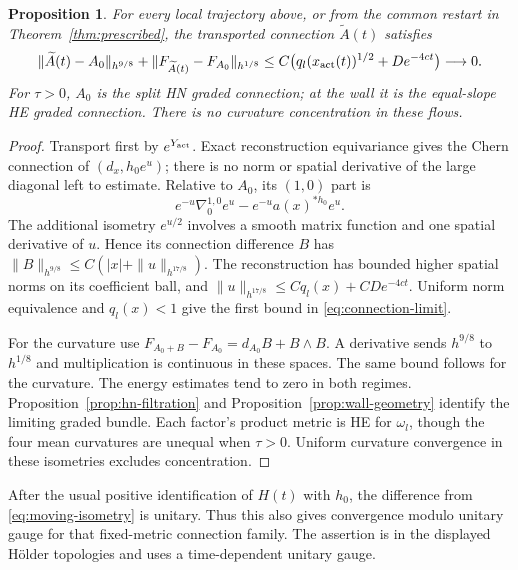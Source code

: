 \documentclass[11pt]{amsart}
\newtheorem{proposition}[theorem]{Proposition}
\theoremstyle{definition}
\theoremstyle{remark}
\begin{document}
\begin{proposition}\label{prop:graded-limit}
For every local trajectory above, or from the common restart
in Theorem~\ref{thm:prescribed}, the transported connection
$\widetilde A(t)$ satisfies
\begin{equation}\label{eq:connection-limit}
 \|\widetilde A(t)-A_0\|_{h^{9/8}}
 +\|F_{\widetilde A(t)}-F_{A_0}\|_{h^{1/8}}
       \le C\bigl(q_l(x_{\rm act}(t))^{1/2}+D e^{-4ct}\bigr)
       \longrightarrow0 .
\end{equation}
For $\tau>0$, $A_0$ is the split HN graded connection;
at the wall it is the equal-slope HE graded connection.
There is no curvature concentration in these flows.
\end{proposition}
\begin{proof}
Transport first by $e^{Y_{\rm act}}$. Exact reconstruction
equivariance gives the Chern connection of $(d_x,h_0e^u)$;
there is no norm or spatial derivative of the large diagonal
left to estimate. Relative to $A_0$, its $(1,0)$ part is
\[
 e^{-u}\nabla_0^{1,0}e^u-e^{-u}a(x)^{*h_0}e^u .
\]
The additional isometry $e^{u/2}$ involves a smooth matrix
function and one spatial derivative of $u$. Hence its
connection difference $B$ has
$\|B\|_{h^{9/8}}\le C(|x|+\|u\|_{h^{17/8}})$.
The reconstruction has bounded higher spatial norms on its
coefficient ball, and
$\|u\|_{h^{17/8}}\le Cq_l(x)+CD e^{-4ct}$.
Uniform norm equivalence and $q_l(x)<1$ give the first
bound in \eqref{eq:connection-limit}.

For the curvature use
$F_{A_0+B}-F_{A_0}=d_{A_0}B+B\wedge B$.
A derivative sends $h^{9/8}$ to $h^{1/8}$ and multiplication
is continuous in these spaces. The same bound follows for
the curvature. The energy estimates tend to zero in both
regimes. Proposition~\ref{prop:hn-filtration} and
Proposition~\ref{prop:wall-geometry} identify the limiting
graded bundle. Each factor's product metric is HE for
$\omega_l$, though the four mean curvatures are unequal
when $\tau>0$. Uniform curvature convergence in these
isometries excludes concentration.
\end{proof}

After the usual positive identification of $H(t)$ with
$h_0$, the difference from \eqref{eq:moving-isometry} is
unitary. Thus this also gives convergence modulo unitary
gauge for that fixed-metric connection family. The assertion
is in the displayed H\"older topologies and uses a
time-dependent unitary gauge.
\end{document}
